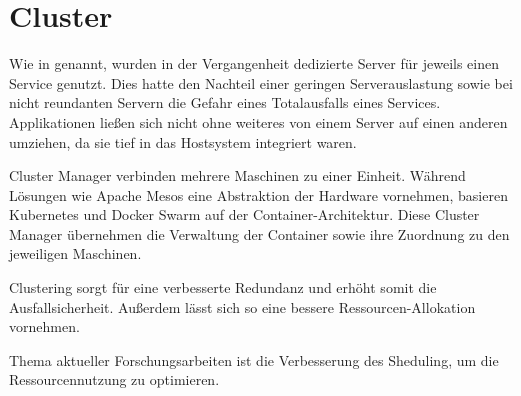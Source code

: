 \section{Cluster}
\label{sec:Cluster}
Wie in  genannt, wurden in der Vergangenheit dedizierte Server für jeweils einen Service genutzt.
Dies hatte den Nachteil einer geringen Serverauslastung sowie bei nicht reundanten Servern die Gefahr eines Totalausfalls eines Services.
Applikationen ließen sich nicht ohne weiteres von einem Server auf einen anderen umziehen, da sie tief in das Hostsystem integriert waren.

Cluster Manager verbinden mehrere Maschinen zu einer Einheit. Während Lösungen wie Apache Mesos eine Abstraktion der Hardware vornehmen, basieren Kubernetes und Docker Swarm auf der Container-Architektur.
Diese Cluster Manager übernehmen die Verwaltung der Container sowie ihre Zuordnung zu den jeweiligen Maschinen.

Clustering sorgt für eine verbesserte Redundanz und erhöht somit die Ausfallsicherheit.
Außerdem lässt sich so eine bessere Ressourcen-Allokation vornehmen.

Thema aktueller Forschungsarbeiten ist die Verbesserung des Sheduling, um die Ressourcennutzung zu optimieren.\cite{Liu2018}

